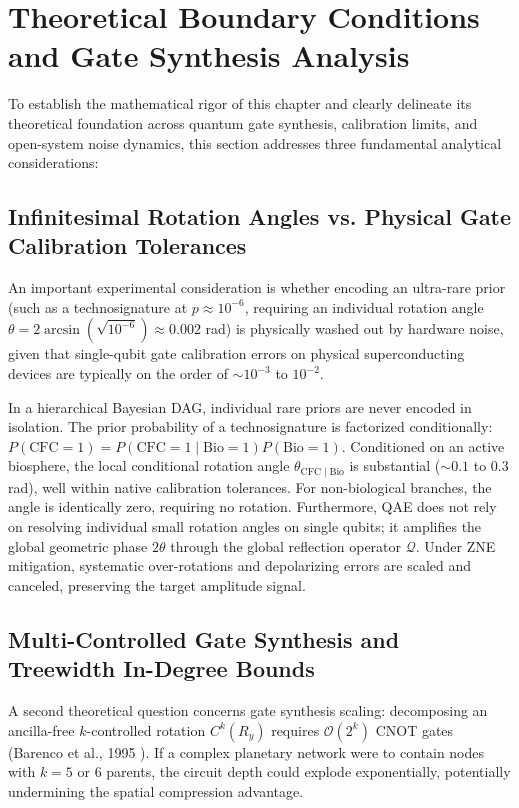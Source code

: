 \section{Theoretical Boundary Conditions and Gate Synthesis Analysis}\label{sec:theoretical_boundaries_ch3}\label{sec:preemptive_defense_ch3}

To establish the mathematical rigor of this chapter and clearly delineate its theoretical foundation across quantum gate synthesis, calibration limits, and open-system noise dynamics, this section addresses three fundamental analytical considerations:

\subsection{Infinitesimal Rotation Angles vs. Physical Gate Calibration Tolerances}
An important experimental consideration is whether encoding an ultra-rare prior (such as a technosignature at $p \approx 10^{-6}$, requiring an individual rotation angle $\theta = 2\arcsin(\sqrt{10^{-6}}) \approx 0.002$ rad) is physically washed out by hardware noise, given that single-qubit gate calibration errors on physical superconducting devices are typically on the order of $\sim 10^{-3}$ to $10^{-2}$.

In a hierarchical Bayesian DAG, individual rare priors are never encoded in isolation. The prior probability of a technosignature is factorized conditionally: $P(\mathrm{CFC}=1) = P(\mathrm{CFC}=1 \mid \mathrm{Bio}=1) P(\mathrm{Bio}=1)$. Conditioned on an active biosphere, the local conditional rotation angle $\theta_{\mathrm{CFC} \mid \mathrm{Bio}}$ is substantial ($\sim 0.1$ to $0.3$ rad), well within native calibration tolerances. For non-biological branches, the angle is identically zero, requiring no rotation. Furthermore, QAE does not rely on resolving individual small rotation angles on single qubits; it amplifies the global geometric phase $2\theta$ through the global reflection operator $\mathcal{Q}$. Under ZNE mitigation, systematic over-rotations and depolarizing errors are scaled and canceled, preserving the target amplitude signal.

\subsection{Multi-Controlled Gate Synthesis and Treewidth In-Degree Bounds}
A second theoretical question concerns gate synthesis scaling: decomposing an ancilla-free $k$-controlled rotation $C^k(R_y)$ requires $\mathcal{O}(2^k)$ CNOT gates (Barenco et al., 1995 \cite{barenco1995}). If a complex planetary network were to contain nodes with $k=5$ or $6$ parents, the circuit depth could explode exponentially, potentially undermining the spatial compression advantage.


